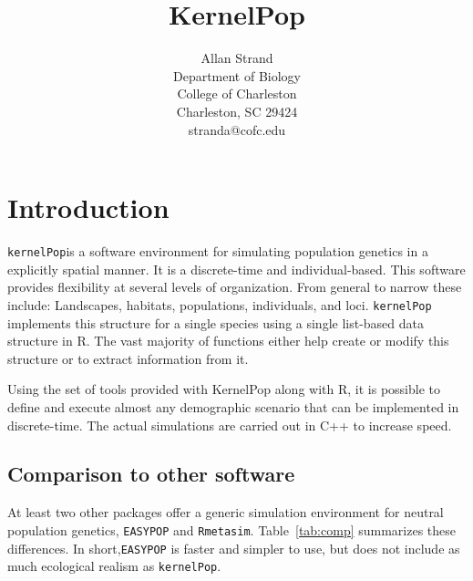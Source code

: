 \documentclass[10pt]{article}
\title{KernelPop}
\author{Allan Strand\\[14pt] Department of Biology\\College of
  Charleston\\Charleston, SC 29424\\stranda@cofc.edu}
\newcommand{\KP}{\texttt{kernelPop}}
\begin{document}

\maketitle


\section{Introduction}
\label{sec:introduction}
\KP is a software environment for simulating population genetics in a
explicitly spatial manner.  It is a discrete-time and
individual-based.  This software provides flexibility at several
levels of organization.  From general to narrow these include:
Landscapes, habitats, populations, individuals, and loci.  \KP
implements this structure for a single species using a single
list-based data structure in R.  The vast majority of functions either
help create or modify this structure or to extract information from
it.  

Using the set of tools provided with KernelPop along with R, it is
possible to define and execute almost any demographic scenario that
can be implemented in discrete-time.  The actual simulations are
carried out in C++ to increase speed.

\subsection{Comparison to other software}
At least two other packages offer a generic simulation environment for
neutral population genetics, \texttt{EASYPOP} and \texttt{Rmetasim}.
Table~\ref{tab:comp} summarizes these differences. In
short,\texttt{EASYPOP} is faster and simpler to use, but does not
include as much ecological realism as \texttt{kernelPop}.
\end{document}
